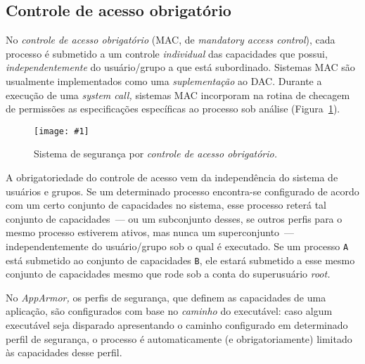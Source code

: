 \documentclass[ruledheader, 12pt]{abnt}
\newcommand{\figcustom}[4]{\par
	\begin{figure}[#3]
		\centering
		\texttt{[image: \#1]}
		\caption{\label{fig:#1}#2}
	\end{figure}
\par}
\newcommand{\figref}[1]{(Figura~\ref{fig:#1})}
\begin{document}
\clearpage
\subsection{Controle de acesso obrigatório}


No \emph{controle de acesso obrigatório} (MAC, de \emph{mandatory access control}), cada processo é submetido a um controle \emph{individual} das capacidades que possui, \emph{independentemente} do usuário/grupo a que está subordinado. Sistemas MAC são usualmente implementados como uma \emph{suplementação} ao DAC. Durante a execução de uma \emph{system call,} sistemas MAC incorporam na rotina de checagem de permissões as especificações específicas ao processo sob análise \figref{syscalls-mac}.

\figcustom{syscalls-mac}{Sistema de segurança por \emph{controle de acesso obrigatório.}}{bp}{.8}

A obrigatoriedade do controle de acesso vem da independência do sistema de usuários e grupos. Se um determinado processo encontra-se configurado de acordo com um certo conjunto de capacidades no sistema, esse processo reterá tal conjunto de capacidades~--- ou um subconjunto desses, se outros perfis para o mesmo processo estiverem ativos, mas nunca um superconjunto~--- independentemente do usuário/grupo sob o qual é executado. Se um processo \verb|A| está submetido ao conjunto de capacidades \verb|B|, ele estará submetido a esse mesmo conjunto de capacidades mesmo que rode sob a conta do superusuário \emph{root.}

No \emph{AppArmor,} os perfis de segurança, que definem as capacidades de uma aplicação, são configurados com base no \emph{caminho} do executável: caso algum executável seja disparado apresentando o caminho configurado em determinado perfil de segurança, o processo é automaticamente (e obrigatoriamente) limitado às capacidades desse perfil.
\end{document}
